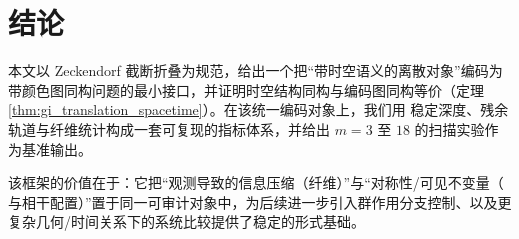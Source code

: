 \section{结论}

本文以 Zeckendorf 截断折叠为规范，给出一个把“带时空语义的离散对象”编码为带颜色图同构问题的最小接口，并证明时空结构同构与编码图同构等价（定理 \ref{thm:gi_translation_spacetime}）。在该统一编码对象上，我们用 \WL{} 稳定深度、残余轨道与纤维统计构成一套可复现的指标体系，并给出 $m=3$ 至 $18$ 的扫描实验作为基准输出。

该框架的价值在于：它把“观测导致的信息压缩（纤维）”与“对称性/可见不变量（\WL{} 与相干配置）”置于同一可审计对象中，为后续进一步引入群作用分支控制、以及更复杂几何/时间关系下的系统比较提供了稳定的形式基础。

